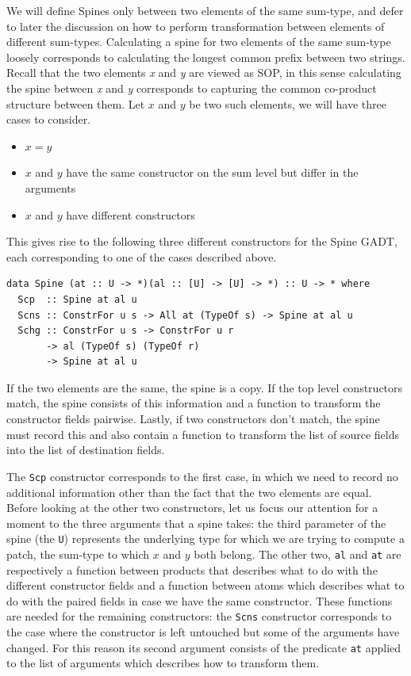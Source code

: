 \documentclass[11pt, titlepage]{article}
\begin{document}
We will define Spines only between two elements of the same sum-type, and defer to later the discussion on how
to perform transformation between elements of different sum-types. Calculating a spine for two elements of the same sum-type 
loosely corresponds to calculating the longest common prefix between two strings. Recall that the two 
elements \emph{x} and \emph{y} are viewed as SOP, in this sense calculating the
spine between \emph{x} and \emph{y} corresponds to capturing the common
co-product structure between them. Let $x$ and $y$ be two such elements, we will have three cases to
consider. 
\begin{itemize}
  \item $x = y$
  \item $x$ and $y$ have the same constructor on the sum level but differ in the 
  arguments
  \item $x$ and $y$ have different constructors
\end{itemize}

This gives rise
to the following three different constructors for the Spine GADT, each
corresponding to one of the cases described above.

\begin{verbatim}
data Spine (at :: U -> *)(al :: [U] -> [U] -> *) :: U -> * where
  Scp  :: Spine at al u
  Scns :: ConstrFor u s -> All at (TypeOf s) -> Spine at al u
  Schg :: ConstrFor u s -> ConstrFor u r
       -> al (TypeOf s) (TypeOf r)
       -> Spine at al u
\end{verbatim}

If the two
elements are the same, the spine is a copy. If the top level
constructors match, the spine consists of this information and a function to
transform the constructor fields pairwise. Lastly, if two constructors
don't match, the spine must record this and also contain a function to
transform the list of source fields into the list of destination fields.

The \texttt{Scp} constructor corresponds to the first case, in which we need
to record no additional information other than the fact that the two
elements are equal. 
Before looking at the other two constructors, let us focus our attention for a moment to the three arguments that a spine takes:
the third parameter of the spine (the \texttt{U}) represents the
underlying type for which we are trying to compute a patch, the sum-type to which $x$ and $y$ both belong.
The other two, \texttt{al} and \texttt{at} are respectively a
function between products that describes what to do with the different
constructor fields and a function between atoms which describes what to
do with the paired fields in case we have the same constructor.
These functions are needed for the remaining constructors: the \texttt{Scns} constructor corresponds to the 
case where the constructor is left untouched but some of the arguments have changed.
For this reason its second argument consists of the predicate \texttt{at} applied to the list of arguments which describes
how to transform them. 
\end{document}
